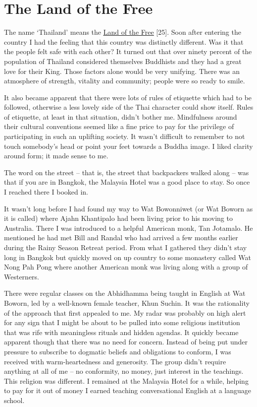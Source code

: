\chapter{The Land of the Free}

The name `Thailand' means the
\href{http://supibee.thaiembassyuk.org.uk/?q=node/28}{\underline{Land of
the Free}} {[}25{]}. Soon after entering the country I had the feeling
that this country was distinctly different. Was it that the people felt
safe with each other? It turned out that over ninety percent of the
population of Thailand considered themselves Buddhists and they had a
great love for their King. Those factors alone would be very unifying.
There was an atmosphere of strength, vitality and community; people were
so ready to smile.

It also became apparent that there were lots of rules of etiquette which
had to be followed, otherwise a less lovely side of the Thai character
could show itself. Rules of etiquette, at least in that situation,
didn't bother me. Mindfulness around their cultural conventions seemed
like a fine price to pay for the privilege of participating in such an
uplifting society. It wasn't difficult to remember to not touch
somebody's head or point your feet towards a Buddha image. I liked
clarity around form; it made sense to me.

The word on the street -- that is, the street that backpackers walked
along -- was that if you are in Bangkok, the Malaysia Hotel was a good
place to stay. So once I reached there I booked in.

It wasn't long before I had found my way to Wat Bowonniwet (or Wat
Boworn as it is called) where Ajahn Khantipalo had been living prior to
his moving to Australia. There I was introduced to a helpful American
monk, Tan Jotamalo. He mentioned he had met Bill and Randal who had
arrived a few months earlier during the Rainy Season Retreat period.
From what I gathered they didn't stay long in Bangkok but quickly moved
on up country to some monastery called Wat Nong Pah Pong where another
American monk was living along with a group of Westerners.

There were regular classes on the Abhidhamma being taught in English at
Wat Boworn, led by a well-known female teacher, Khun Suchin. It was the
rationality of the approach that first appealed to me. My radar was
probably on high alert for any sign that I might be about to be pulled
into some religious institution that was rife with meaningless rituals
and hidden agendas. It quickly became apparent though that there was no
need for concern. Instead of being put under pressure to subscribe to
dogmatic beliefs and obligations to conform, I was received with
warm-heartedness and generosity. The group didn't require anything at
all of me -- no conformity, no money, just interest in the teachings.
This religion was different. I remained at the Malaysia Hotel for a
while, helping to pay for it out of money I earned teaching
conversational English at a language school.

